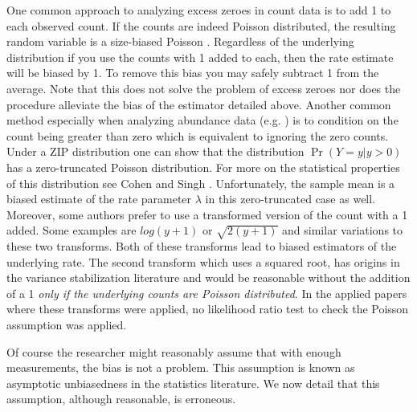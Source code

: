 \documentclass{article}
\begin{document}
One common approach to analyzing excess zeroes in count data is to add 1 to each observed count. If the counts are indeed Poisson distributed, the resulting random variable is a size-biased Poisson \cite{arratia2013size,arratia2010size}. Regardless of the underlying distribution if you use the counts with 1 added to each, then the rate estimate will be biased by 1. To remove this bias you may safely subtract 1 from the average. Note that this does not solve the problem of excess zeroes nor does the procedure alleviate the bias of the estimator detailed above. Another common method especially when analyzing abundance data (e.g. \cite{jagdale2013incidence}) is to condition on the count being greater than zero  which is equivalent to ignoring the zero counts. Under a ZIP distribution one can show that the distribution $\Pr(Y=y \vert y>0)$ has a zero-truncated Poisson distribution. For more on the statistical properties of this distribution see Cohen \cite{cohen1960estimating} and Singh \cite{singh1978characterization}. Unfortunately, the sample mean is a biased estimate of the rate parameter $\lambda$ in this zero-truncated case as well. Moreover, some authors prefer to use a transformed version of the count with a 1 added. Some examples are $log(y+1)$ \cite{howland2014spatial,centinari2016root} or $\sqrt{2(y+1)}$ \cite{anscombe1948transformation,yu2009variance} and similar variations to these two transforms. Both of these transforms lead to biased estimators of the underlying rate. The second transform which uses a squared root, has origins in the variance stabilization literature \cite{freeman1950transformations} and would be reasonable without the addition of a 1 \emph{only if the underlying counts are Poisson distributed}. In the applied papers where these transforms were applied, no likelihood ratio test to check the Poisson assumption was applied.

Of course the researcher might reasonably assume that with enough measurements, the bias is not a problem. This assumption is known as asymptotic unbiasedness in the statistics literature. We now detail that this assumption, although reasonable, is erroneous. 
\end{document}
